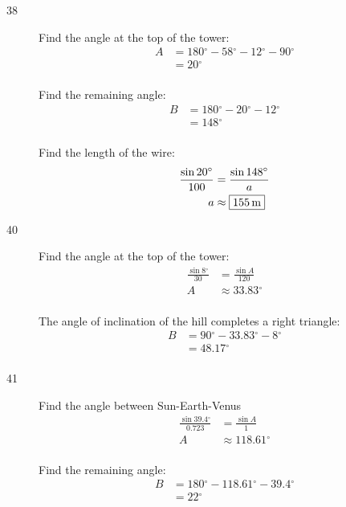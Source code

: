 \documentclass{exam}
\newcommand{\dg}{\ensuremath{^\circ}}
\begin{document}
\begin{description}
      \item[38] 
        Find the angle at the top of the tower:
        \begin{align*}
          A & = 180 \dg - 58 \dg - 12 \dg - 90 \dg \\
            & = 20 \dg \\
        \end{align*}

        Find the remaining angle:
        \begin{align*}
          B & = 180 \dg - 20 \dg - 12 \dg \\
            & = 148 \dg \\
        \end{align*}

        Find the length of the wire:
        \begin{align*}
          \frac{\sin 20 \dg}{100} & = \frac{\sin 148 \dg}{a} \\
          a                       & \approx \boxed{ \unit[155]{m} } \\
        \end{align*}

      \item[40] 
        Find the angle at the top of the tower:
        \begin{align*}
          \frac{\sin 8 \dg}{30} & = \frac{\sin A}{120} \\
          A                     & \approx 33.83 \dg \\
        \end{align*}

        The angle of inclination of the hill completes a right triangle:
        \begin{align*}
          B & = 90 \dg - 33.83 \dg - 8 \dg \\
            & = \boxed{ 48.17 \dg } \\
        \end{align*}

      \item[41] 
        Find the angle between Sun-Earth-Venus
        \begin{align*}
          \frac{\sin 39.4 \dg}{0.723} & = \frac{\sin A}{1} \\
          A                     & \approx 118.61 \dg \\
        \end{align*}

        Find the remaining angle:
        \begin{align*}
          B & = 180 \dg - 118.61 \dg - 39.4 \dg \\
            & = 22 \dg \\
        \end{align*}


\end{description}
\end{document}
